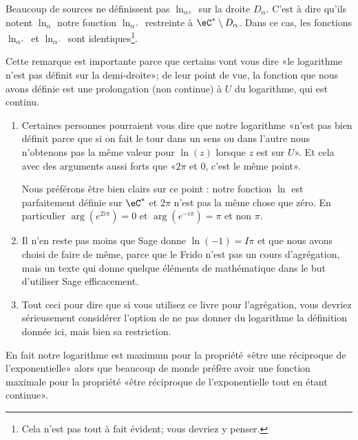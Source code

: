 \begin{remark}      \label{REMooFBLLooDnkmjR}
    Beaucoup de sources\cite{ooGUROooApafph} ne définissent pas \( \ln_{\alpha^{\pm}}\) sur la droite \( D_{\alpha}\). C'est à dire qu'ils notent \( \ln_{\alpha}\) notre fonction \( \ln_{\alpha^+}\) restreinte à \( \eC^*\setminus D_{\alpha}\). Dans ce cas, les fonctions \( \ln_{\alpha^+}\) et \( \ln_{\alpha^-}\) sont identiques\footnote{Cela n'est pas tout à fait évident; vous devriez y penser.}.

    Cette remarque est importante parce que certains vont vous dire «le logarithme n'est pas définit sur la demi-droite»; de leur point de vue, la fonction que nous avons définie est une prolongation (non continue) à \( U\) du logarithme, qui est continu.

    \begin{enumerate}
        \item
            Certaines personnes pourraient vous dire que notre logarithme «n'est pas bien définit parce que si on fait le tour dans un sens ou dans l'autre nous n'obtenons pas la même valeur pour \( \ln(z)\) lorsque \( z\) est sur \( U\)». Et cela avec des arguments aussi forts que «\( 2\pi\) et \( 0\), c'est le même point».

    Nous préférons être bien clairs sur ce point : notre fonction \( \ln\) est parfaitement définie sur \( \eC^*\) et \( 2\pi\) n'est pas la même chose que zéro. En particulier \( \arg( e^{2i\pi})=0\) et \(  \arg(e^{-i\pi})=\pi\) et non \( \pi\).
        \item
            Il n'en reste pas moins que Sage donne \( \ln(-1)=I\pi\) et que nous avons choisi de faire de même, parce que le Frido n'est pas un cours d'agrégation, mais un texte qui donne quelque éléments de mathématique dans le but d'utiliser Sage efficacement.
        \item
            Tout ceci pour dire que si vous utilisez ce livre pour l'agrégation, vous devriez sérieusement considérer l'option de ne pas donner du logarithme la définition donnée ici, mais bien sa restriction.
    \end{enumerate}

    En fait notre logarithme est maximum pour la propriété «être une réciproque de l'exponentielle» alors que beaucoup de monde préfère avoir une fonction maximale pour la propriété «être réciproque de l'exponentielle tout en étant continue».

\end{remark}


